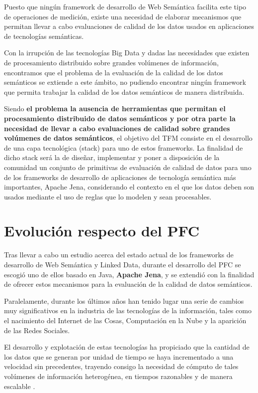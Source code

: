 Puesto que ningún framework de desarrollo de Web Semántica facilita este tipo de
operaciones de medición, existe una necesidad de elaborar
mecanismos que permitan llevar a cabo evaluaciones de calidad de los datos
usados en aplicaciones de tecnologías semánticas.


Con la irrupción de las tecnologías Big Data y dadas las necesidades que existen
de procesamiento distribuido sobre grandes volúmenes de información, encontramos
que el problema de la evaluación de la calidad de los datos semánticos se
extiende a este ámbito, no pudiendo encontrar ningún framework que permita
trabajar la calidad de los datos semánticos de manera distribuida.



Siendo \textbf{el problema la ausencia de herramientas que permitan el procesamiento
distribuido de datos semánticos y por otra parte la necesidad de llevar a cabo
evaluaciones de calidad sobre grandes volúmenes de datos semánticos}, el objetivo del \acf{TFM}
consiste en el desarrollo de una capa tecnológica (stack) para uno de estos frameworks. La finalidad de
dicho stack será la de diseñar, implementar y poner a disposición de la
comunidad un conjunto de primitivas de evaluación de calidad de datos para uno de
los frameworks de desarrollo de aplicaciones de tecnología semántica más
importantes, Apache Jena, considerando el contexto en el que los
datos deben son usados mediante el uso de reglas que lo modelen y sean procesables.


\section{Evolución respecto del PFC}


Tras llevar a cabo un estudio acerca del estado actual de los frameworks de
desarrollo de Web Semántica y Linked Data, durante el desarrollo del \acf{PFC}
se escogió uno de ellos basado en
Java, \textbf{Apache Jena}, y se extendió con la finalidad de ofrecer estos
mecanismos para la evaluación de la calidad de datos semánticos.

Paralelamente, durante los últimos años han tenido lugar una serie de cambios muy
significativos
en la industria de las tecnologías de la información, tales como el nacimiento
del Internet
de las Cosas, Computación en la Nube y la aparición de las Redes Sociales.


El desarrollo y explotación de estas tecnologías ha propiciado que la cantidad
de los datos
que se generan por unidad de tiempo se haya incrementado a una velocidad sin
precedentes,
trayendo consigo la necesidad de cómputo de tales volúmenes de información
heterogénea,
en tiempos razonables y de manera escalable \cite{map_reduce}.

